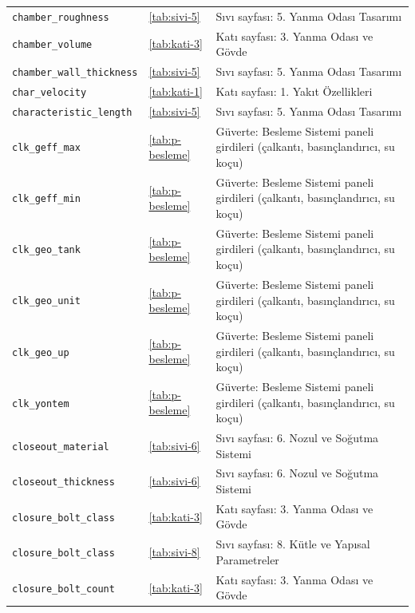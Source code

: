 \documentclass[11pt,a4paper]{article}
\begin{document}
{\begin{longtable}{@{}>{\raggedright\arraybackslash}p{5.2cm}p{1.4cm}>{\raggedright\arraybackslash}p{7.4cm}@{}}
\texttt{chamber\_\allowbreak{}roughness} & \ref{tab:sivi-5} & Sıvı sayfası: 5. Yanma Odası Tasarımı \\
\texttt{chamber\_\allowbreak{}volume} & \ref{tab:kati-3} & Katı sayfası: 3. Yanma Odası ve Gövde \\
\texttt{chamber\_\allowbreak{}wall\_\allowbreak{}thickness} & \ref{tab:sivi-5} & Sıvı sayfası: 5. Yanma Odası Tasarımı \\
\texttt{char\_\allowbreak{}velocity} & \ref{tab:kati-1} & Katı sayfası: 1. Yakıt Özellikleri \\
\texttt{characteristic\_\allowbreak{}length} & \ref{tab:sivi-5} & Sıvı sayfası: 5. Yanma Odası Tasarımı \\
\texttt{clk\_\allowbreak{}geff\_\allowbreak{}max} & \ref{tab:p-besleme} & Güverte: Besleme Sistemi paneli girdileri (çalkantı, basınçlandırıcı, su koçu) \\
\texttt{clk\_\allowbreak{}geff\_\allowbreak{}min} & \ref{tab:p-besleme} & Güverte: Besleme Sistemi paneli girdileri (çalkantı, basınçlandırıcı, su koçu) \\
\texttt{clk\_\allowbreak{}geo\_\allowbreak{}tank} & \ref{tab:p-besleme} & Güverte: Besleme Sistemi paneli girdileri (çalkantı, basınçlandırıcı, su koçu) \\
\texttt{clk\_\allowbreak{}geo\_\allowbreak{}unit} & \ref{tab:p-besleme} & Güverte: Besleme Sistemi paneli girdileri (çalkantı, basınçlandırıcı, su koçu) \\
\texttt{clk\_\allowbreak{}geo\_\allowbreak{}up} & \ref{tab:p-besleme} & Güverte: Besleme Sistemi paneli girdileri (çalkantı, basınçlandırıcı, su koçu) \\
\texttt{clk\_\allowbreak{}yontem} & \ref{tab:p-besleme} & Güverte: Besleme Sistemi paneli girdileri (çalkantı, basınçlandırıcı, su koçu) \\
\texttt{closeout\_\allowbreak{}material} & \ref{tab:sivi-6} & Sıvı sayfası: 6. Nozul ve Soğutma Sistemi \\
\texttt{closeout\_\allowbreak{}thickness} & \ref{tab:sivi-6} & Sıvı sayfası: 6. Nozul ve Soğutma Sistemi \\
\texttt{closure\_\allowbreak{}bolt\_\allowbreak{}class} & \ref{tab:kati-3} & Katı sayfası: 3. Yanma Odası ve Gövde \\
\texttt{closure\_\allowbreak{}bolt\_\allowbreak{}class} & \ref{tab:sivi-8} & Sıvı sayfası: 8. Kütle ve Yapısal Parametreler \\
\texttt{closure\_\allowbreak{}bolt\_\allowbreak{}count} & \ref{tab:kati-3} & Katı sayfası: 3. Yanma Odası ve Gövde \\

\end{longtable}}
\end{document}
